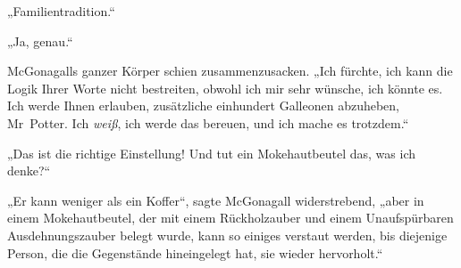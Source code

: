 „Familientradition.“

„Ja, genau.“

McGonagalls ganzer Körper schien zusammenzusacken.
„Ich fürchte, ich kann die Logik Ihrer Worte nicht bestreiten, obwohl ich mir sehr wünsche, ich könnte es. Ich werde Ihnen erlauben, zusätzliche einhundert Galleonen abzuheben, Mr~Potter. Ich \emph{weiß}, ich werde das bereuen, und ich mache es trotzdem.“

„Das ist die richtige Einstellung! Und tut ein Mokehautbeutel das, was ich denke?“%

„Er kann weniger als ein Koffer“, sagte McGonagall widerstrebend, „aber in einem Mokehautbeutel, der mit einem Rückholzauber und einem Unaufspürbaren Ausdehnungszauber belegt wurde, kann so einiges verstaut werden, bis diejenige Person, die die Gegenstände hineingelegt hat, sie wieder hervorholt.“


